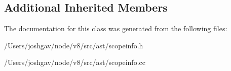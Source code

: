 \subsection*{Additional Inherited Members}


The documentation for this class was generated from the following files\+:\begin{DoxyCompactItemize}
\item 
/\+Users/joshgav/node/v8/src/ast/scopeinfo.\+h\item 
/\+Users/joshgav/node/v8/src/ast/scopeinfo.\+cc\end{DoxyCompactItemize}

